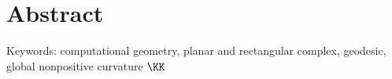 \chapter*{Abstract}
\lipsum[1]

\vspace{0.5cm}
Keywords: computational geometry, planar and rectangular complex, geodesic, global nonpositive curvature $\KK$
